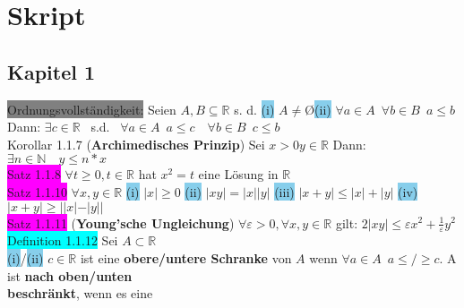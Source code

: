 \documentclass[10pt]{article}
\newcommand{\R}{\mathbb{R}}
\begin{document}
\pagestyle{fancy}
\fancyhf{}
\cfoot{\thepage}
\section{Skript}
\subsection*{Kapitel 1}
\colorbox{gray}{Ordnungsvollständigkeit:} Seien $A, B\subseteq\R$ s. d.
                \quad\colorbox{SkyBlue}{(i)} $A\neq$\O\colorbox{SkyBlue}{(ii)} 
                $\forall a\in A \enspace \forall b 
                \in B \enspace a \leqslant b$ \\
        \indent\indent Dann: $\exists c\in\R\enspace$ 
                s.d. $\enspace\forall a\in A\enspace a\leqslant c\quad\forall b\in 
                B\enspace c\leqslant b$ \\
\colorbox{BurntOrange}{Korollar 1.1.7} (\textbf{Archimedisches Prinzip}) 
                Sei \textcolor{NavyBlue}{$x>0 y\in\R$}
                \quad Dann: \textcolor{NavyBlue}{
                $\exists n\in \mathbb{N} \quad y\leqslant n*x$}\\
\colorbox{magenta}{Satz 1.1.8} \textcolor{NavyBlue}{
                $\forall t\geqslant 0, t\in\R$} hat \textcolor{NavyBlue}{$x^2=t$} 
                eine Lösung in $\R$\\
\colorbox{magenta}{Satz 1.1.10} $\forall x,y\in\R$ 
        \indent\colorbox{SkyBlue}{(i)} $|x|\geqslant 0$ \quad\colorbox{SkyBlue}{(ii)} 
                $|xy|=|x||y|$ \quad
                \colorbox{SkyBlue}{(iii)} $|x+y|\leqslant |x|+|y|$
                \quad\colorbox{SkyBlue}{(iv)} $|x+y|\geqslant ||x|-|y||$\\
\colorbox{magenta}{Satz 1.1.11} (\textbf{Young'sche Ungleichung})
                \textcolor{NavyBlue}{
                $\forall\varepsilon >0, \forall x,y\in\R$} 
                gilt: \qquad \textcolor{NavyBlue}{
                $2|xy|\leqslant\varepsilon x^2+\frac{1}{\varepsilon}y^2$}\\
\colorbox{cyan}{Definition 1.1.12} Sei $A\subset\R$\\
        \indent \colorbox{SkyBlue}{(i)}/\colorbox{SkyBlue}{(ii)} $c\in\R$ ist eine 
                \textbf{obere/untere Schranke }
                von $A$ wenn \textcolor{NavyBlue}{
                $\forall a \in A \enspace a\leqslant / \geqslant c$}. A ist 
                \textbf{nach oben/unten \\
        \indent\indent beschränkt}, wenn es eine 
\end{document}
